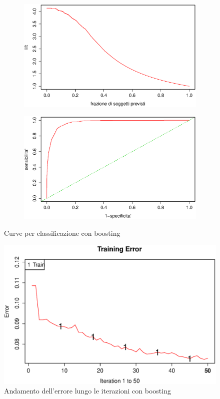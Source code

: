 \begin{figure}[H]
  \begin{subfigure}{0.4\textwidth}
    \includegraphics[width=\columnwidth]{images/class/lift-boosting.eps}
  \end{subfigure}
  \hspace*{\fill}
  \begin{subfigure}{0.4\textwidth}
    \includegraphics[width=\columnwidth]{images/class/roc-boosting.eps}
  \end{subfigure}
  \caption{Curve per classificazione con boosting}
  \label{fig:class-tree}
\end{figure}

\begin{figure}[H]
  \centering
  \includegraphics[width=.5\columnwidth]{images/class/boosting-plot.eps}
  \caption{Andamento dell'errore lungo le iterazioni con boosting}
  \label{fig:final-class-tree}
\end{figure}
